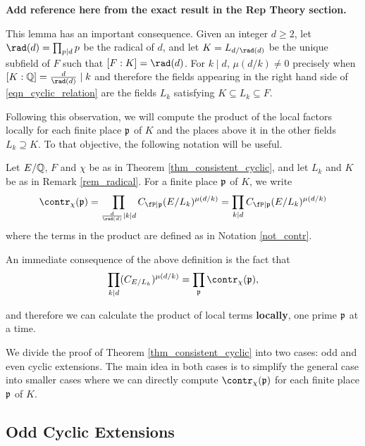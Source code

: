 \textbf{Add reference here from the exact result in the Rep Theory section.}

\begin{rem}\label{rem_radical}
    This lemma has an important consequence. Given an integer $d\geq2$, let $\rad(d)=\prod_{p\mid d}p$ be the radical of $d$, and let $K=L_{d/\rad(d)}$ be the unique subfield of $F$ such that $[F:K]=\rad(d)$. For $k\mid d$, $\mu(d/k)\neq 0$ precisely when $[K:\QQ]=\frac{d}{\rad(d)}\mid k$ and therefore the fields appearing in the right hand side of \eqref{eqn_cyclic_relation} are the fields $L_k$ satisfying $K\subseteq L_k\subseteq F$. 
\end{rem}

Following this observation, we will compute the product of the local factors locally for each finite place $\mathfrak{p}$ of $K$ and the places above it in the other fields $L_k\supseteq K$. To that objective, the following notation will be useful.

\begin{notation}\label{not_local_contr}
    Let $E/\mathbb{Q}$, $F$ and $\chi$ be as in Theorem \ref{thm_consistent_cyclic}, and let $L_k$ and $K$ be as in Remark \ref{rem_radical}. For a finite place $\mathfrak{p}$ of $K$, we write
    $$\contr_\chi(\pp)=\prod_{\frac{d}{\rad(d)}\mid k\mid d}C_{\fP\mid\pp}(E/L_k)^{\mu(d/k)}=\prod_{k\mid d}C_{\fP\mid\pp}(E/L_k)^{\mu(d/k)}$$ 
    where the terms in the product are defined as in Notation \ref{not_contr}. 
\end{notation}

An immediate consequence of the above definition is the fact that 
\begin{equation}\label{eqn_local_contr}
    \prod_{k\mid d}(C_{E/L_k})^{\mu(d/k)}=\prod_\pp\contr_\chi(\pp),
\end{equation}

and therefore we can calculate the product of local terms \textbf{locally}, one prime $\mathfrak{p}$ at a time.

We divide the proof of Theorem \ref{thm_consistent_cyclic} into two cases: odd and even cyclic extensions. The main idea in both cases is to simplify the general case into smaller cases where we can directly compute $\contr_\chi(\pp)$ for each finite place $\mathfrak{p}$ of $K$. 

\subsection*{Odd Cyclic Extensions} \label{case_Cp}

